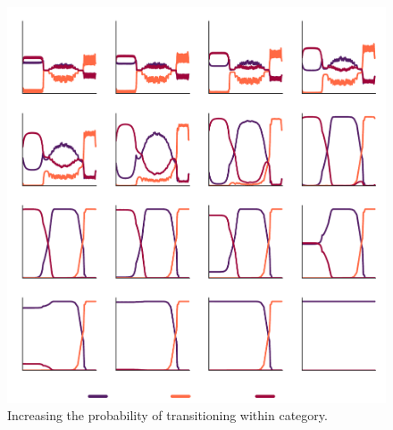 \documentclass[times, twoside, watermark]{zHenriquesLab-StyleBioRxiv}
\begin{document}
\begin{figure}%
\centering
\includegraphics[width=1.0\linewidth]{figures/Figure1-supplemental1/Figure1_v1_supplemental1.pdf}
\caption{Increasing the probability of transitioning within category.}
\label{fig:Supplemental Figure 3}
\end{figure}

\end{document}
